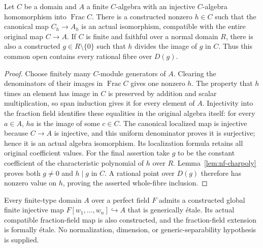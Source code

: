 \begin{lemma}\label{lem:fc-finite-birational-open}
\leanok
{}
Let $C$ be a domain and $A$ a finite $C$-algebra with an injective $C$-algebra homomorphism into
$\operatorname{Frac} C$. There is a constructed nonzero $h\in C$ such that the canonical map
$C_h\to A_h$ is an actual isomorphism, compatible with the entire original map $C\to A$.
If $C$ is finite and faithful over a normal domain $R$, there is also a constructed $g\in R\setminus\{0\}$
such that $h$ divides the image of $g$ in $C$. Thus this common open contains every rational fibre over $D(g)$.
\end{lemma}

\begin{proof}
Choose finitely many $C$-module generators of $A$. Clearing the denominators of their images in
$\operatorname{Frac} C$ gives one nonzero $h$. The property that $h$ times an element has image in $C$
is preserved by addition and scalar multiplication, so span induction gives it for every element of $A$.
Injectivity into the fraction field identifies these equalities in the original algebra itself:
for every $a\in A$, $ha$ is the image of some $c\in C$. The canonical localized map is injective because
$C\to A$ is injective, and this uniform denominator proves it is surjective; hence it is an actual algebra
isomorphism. Its localization formula retains all original coefficient values.
For the final assertion take $g$ to be the constant coefficient of the characteristic polynomial of $h$
over $R$. Lemma~\ref{lem:nf-charpoly} proves both $g\ne0$ and $h\mid g$ in $C$. A rational point over $D(g)$
therefore has nonzero value on $h$, proving the asserted whole-fibre inclusion.
\end{proof}

\begin{lemma}\label{lem:fc-separating-normalization}
\leanok
{}
Every finite-type domain $A$ over a perfect field $F$ admits a constructed global finite injective map
$F[w_1,\ldots,w_n]\hookrightarrow A$ that is generically \'etale. Its actual compatible fraction-field map is
also constructed, and the fraction-field extension is formally \'etale. No normalization, dimension, or
generic-separability hypothesis is supplied.
\end{lemma}


